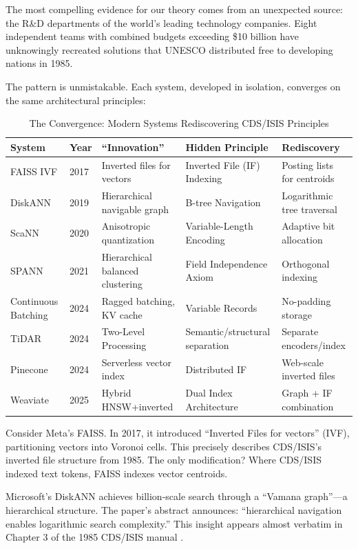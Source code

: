 \documentclass[manuscript,screen,review]{acmart}
\begin{document}
The most compelling evidence for our theory comes from an unexpected source: the R\&D departments of the world's leading technology companies. Eight independent teams with combined budgets exceeding \$10 billion have unknowingly recreated solutions that UNESCO distributed free to developing nations in 1985.

The pattern is unmistakable. Each system, developed in isolation, converges on the same architectural principles:

\begin{table}[h]
\caption{The Convergence: Modern Systems Rediscovering CDS/ISIS Principles}
\label{tab:convergence}
\begin{tabular}{llllp{3.5cm}}
\toprule
System & Year & ``Innovation'' & Hidden Principle & Rediscovery \\
\midrule
FAISS IVF \cite{johnson2017} & 2017 & Inverted files for vectors & Inverted File (IF) Indexing & Posting lists for centroids \\
DiskANN \cite{subramanya2019} & 2019 & Hierarchical navigable graph & B-tree Navigation & Logarithmic tree traversal \\
ScaNN \cite{guo2020} & 2020 & Anisotropic quantization & Variable-Length Encoding & Adaptive bit allocation \\
SPANN \cite{chen2021} & 2021 & Hierarchical balanced clustering & Field Independence Axiom & Orthogonal indexing \\
Continuous Batching \cite{ouazan2025} & 2024 & Ragged batching, KV cache & Variable Records & No-padding storage \\
TiDAR \cite{liu2024} & 2024 & Two-Level Processing & Semantic/structural separation & Separate encoders/index \\
Pinecone \cite{pinecone2024} & 2024 & Serverless vector index & Distributed IF & Web-scale inverted files \\
Weaviate \cite{weaviate2025} & 2025 & Hybrid HNSW+inverted & Dual Index Architecture & Graph + IF combination \\
\bottomrule
\end{tabular}
\end{table}

Consider Meta's FAISS. In 2017, it introduced ``Inverted Files for vectors'' (IVF), partitioning vectors into Voronoi cells. This precisely describes CDS/ISIS's inverted file structure from 1985. The only modification? Where CDS/ISIS indexed text tokens, FAISS indexes vector centroids.

Microsoft's DiskANN achieves billion-scale search through a ``Vamana graph''---a hierarchical structure. The paper's abstract announces: ``hierarchical navigation enables logarithmic search complexity.'' This insight appears almost verbatim in Chapter 3 of the 1985 CDS/ISIS manual \cite{unesco1989}.
\end{document}
